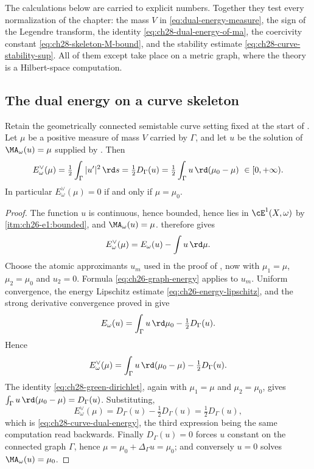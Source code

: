 The calculations below are carried to explicit numbers.  Together they test
every normalization of the chapter: the mass $V$ in
\eqref{eq:dual-energy-measure}, the sign of the Legendre transform, the
identity \eqref{eq:ch28-dual-energy-of-ma}, the coercivity constant
\eqref{eq:ch28-skeleton-M-bound}, and the stability estimate
\eqref{eq:ch28-curve-stability-sup}.  All of them except
 take place on a metric graph, where the
theory is a Hilbert-space computation.

\subsection{The dual energy on a curve skeleton}
\label{sec:ch28-curve-dual-energy}

\begin{proposition}
\label{prop:ch28-curve-dual-energy}
Retain the geometrically connected semistable curve setting fixed at the
start of .  Let $\mu$ be a positive measure
of mass $V$ carried by $\Gamma$, and let $u$ be the solution of
$\MA_\omega(u)=\mu$ supplied by .  Then
\begin{equation}
\label{eq:ch28-curve-dual-energy}
 E^\vee_\omega(\mu)
 =\tfrac12\int_\Gamma|u'|^2\,\rd s
 =\tfrac12 D_\Gamma(u)
 =\tfrac12\int_\Gamma u\,\rd(\mu_0-\mu)
 \ \in[0,+\infty).
\end{equation}
In particular $E^\vee_\omega(\mu)=0$ if and only if $\mu=\mu_0$.
\end{proposition}

\begin{proof}
The function $u$ is continuous, hence bounded, hence lies in
$\cE^1(X,\omega)$ by
\,\cref{itm:ch26-e1:bounded}, and
$\MA_\omega(u)=\mu$.   therefore gives
\[
 E^\vee_\omega(\mu)=E_\omega(u)-\int u\,\rd\mu .
\]
Choose the atomic approximants $u_m$ used in the proof of
, now with $\mu_1=\mu$,
$\mu_2=\mu_0$ and $u_2=0$.  Formula \eqref{eq:ch26-graph-energy} applies
to $u_m$.  Uniform convergence, the energy Lipschitz estimate
\eqref{eq:ch26-energy-lipschitz}, and the strong derivative convergence proved in
 give
\[
 E_\omega(u)=\int_\Gamma u\,\rd\mu_0-\tfrac12 D_\Gamma(u).
\]
Hence
\[
 E^\vee_\omega(\mu)
 =\int_\Gamma u\,\rd(\mu_0-\mu)-\tfrac12D_\Gamma(u).
\]
The identity \eqref{eq:ch28-green-dirichlet}, again with
$\mu_1=\mu$ and $\mu_2=\mu_0$, gives
$\int_\Gamma u\,\rd(\mu_0-\mu)=D_\Gamma(u)$.  Substituting,
\[
 E^\vee_\omega(\mu)=D_\Gamma(u)-\tfrac12D_\Gamma(u)
 =\tfrac12D_\Gamma(u),
\]
which is \eqref{eq:ch28-curve-dual-energy}, the third expression being the
same computation read backwards.  Finally $D_\Gamma(u)=0$ forces $u$
constant on the connected graph $\Gamma$, hence
$\mu=\mu_0+\Delta_\Gamma u=\mu_0$; and conversely $u=0$ solves
$\MA_\omega(u)=\mu_0$.
\end{proof}

